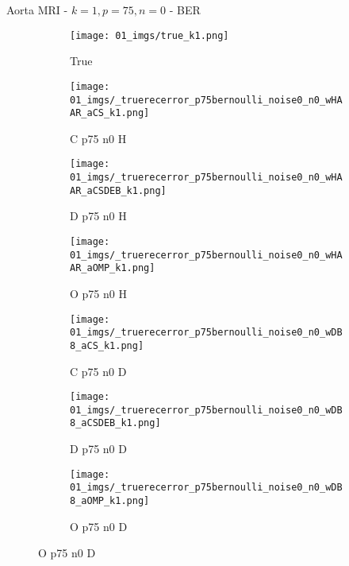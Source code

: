 \begin{frame}{Aorta MRI - $k=1,p=75,n=0$ - BER}{}
\begin{figure}
\begin{subfigure}{0.13\textwidth}
\texttt{[image: 01\_imgs/true\_k1.png]}
\caption*{\tiny True}
\end{subfigure}
\begin{subfigure}{0.13\textwidth}
\texttt{[image: 01\_imgs/\_truerecerror\_p75bernoulli\_noise0\_n0\_wHAAR\_aCS\_k1.png]}
\caption*{\tiny C p75 n0 H}
\end{subfigure}
\begin{subfigure}{0.13\textwidth}
\texttt{[image: 01\_imgs/\_truerecerror\_p75bernoulli\_noise0\_n0\_wHAAR\_aCSDEB\_k1.png]}
\caption*{\tiny D p75 n0 H}
\end{subfigure}
\begin{subfigure}{0.13\textwidth}
\texttt{[image: 01\_imgs/\_truerecerror\_p75bernoulli\_noise0\_n0\_wHAAR\_aOMP\_k1.png]}
\caption*{\tiny O p75 n0 H}
\end{subfigure}
\begin{subfigure}{0.13\textwidth}
\texttt{[image: 01\_imgs/\_truerecerror\_p75bernoulli\_noise0\_n0\_wDB8\_aCS\_k1.png]}
\caption*{\tiny C p75 n0 D}
\end{subfigure}
\begin{subfigure}{0.13\textwidth}
\texttt{[image: 01\_imgs/\_truerecerror\_p75bernoulli\_noise0\_n0\_wDB8\_aCSDEB\_k1.png]}
\caption*{\tiny D p75 n0 D}
\end{subfigure}
\begin{subfigure}{0.13\textwidth}
\texttt{[image: 01\_imgs/\_truerecerror\_p75bernoulli\_noise0\_n0\_wDB8\_aOMP\_k1.png]}
\caption*{\tiny O p75 n0 D}
\end{subfigure}
\end{figure}
\end{frame}

